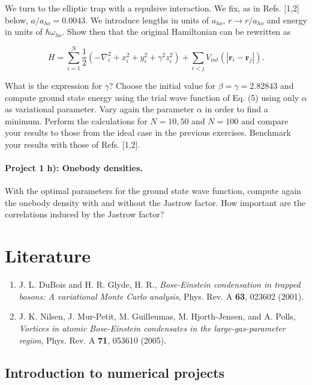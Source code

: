 \documentclass[%
oneside,                 %
final,                   %
10pt]{article}
\begin{document}
We turn to the elliptic trap with a repulsive
   interaction.  We fix, as in Refs. [1,2] below,
   $a/a_{ho}=0.0043$. We introduce lengths in units of $a_{ho}$,
   $r\rightarrow r/a_{ho}$ and energy in units of $\hbar\omega_{ho}$.
   Show then that the original Hamiltonian can be rewritten as

\begin{equation*} 
    H=\sum_{i=1}^N\frac{1}{2}\left(-\nabla^2_i+x_i^2+y_i^2+\gamma^2z_i^2\right)+\sum_{i<j}V_{int}(|\mathbf{r}_i-\mathbf{r}_j|).
 \end{equation*}

What is the expression for $\gamma$?  Choose the initial value for
 $\beta=\gamma = 2.82843$ and compute 
 ground state energy using the trial wave function of
 Eq. (5)  using only $\alpha$ as variational
 parameter.  Vary again the parameter
 $\alpha$ in order to find a minimum.
 Perform the calculations for
 $N=10,50$ and $N=100$ and compare your results to those from the
 ideal case in the previous exercises.  Benchmark your results with
 those of Refs. [1,2].

\paragraph{Project 1 h): Onebody densities.}
With the optimal parameters for the ground state wave function,
compute again the onebody density with and without the Jastrow factor.
How important are the correlations induced by the Jastrow factor?

\section*{Literature}

\begin{enumerate}
 \item J. L. DuBois and H. R. Glyde, H. R., \emph{Bose-Einstein condensation in trapped bosons: A variational Monte Carlo analysis}, Phys. Rev. A \textbf{63}, 023602 (2001).

 \item J. K. Nilsen,  J. Mur-Petit, M. Guilleumas, M. Hjorth-Jensen, and A. Polls, \emph{Vortices in atomic Bose-Einstein condensates in the large-gas-parameter region}, Phys. Rev. A \textbf{71}, 053610 (2005).
\end{enumerate}

\noindent
\subsection*{Introduction to numerical projects}
\end{document}
